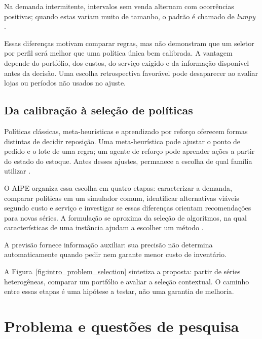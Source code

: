 Na demanda intermitente, intervalos sem venda alternam com ocorrências positivas; quando estas variam muito de tamanho, o padrão é chamado de \textit{lumpy} \citep{Croston1972ForecastingIntermittentDemand,Syntetos2005Categorization,Boylan2008Intermittent}.

Essas diferenças motivam comparar regras, mas não demonstram que um seletor por perfil será melhor que uma política única bem calibrada. A vantagem depende do portfólio, dos custos, do serviço exigido e da informação disponível antes da decisão. Uma escolha retrospectiva favorável pode desaparecer ao avaliar lojas ou períodos não usados no ajuste.

\subsection{Da calibração à seleção de políticas}

Políticas clássicas, meta-heurísticas e aprendizado por reforço oferecem formas distintas de decidir reposição. Uma meta-heurística pode ajustar o ponto de pedido e o lote de uma regra; um agente de reforço pode aprender ações a partir do estado do estoque. Antes desses ajustes, permanece a escolha de qual família utilizar \citep{Syntetos2009InventoryForecastingReview,Boute2022DRLInventoryRoadmap}.

O AIPE organiza essa escolha em quatro etapas: caracterizar a demanda, comparar políticas em um simulador comum, identificar alternativas viáveis segundo custo e serviço e investigar se essas diferenças orientam recomendações para novas séries. A formulação se aproxima da seleção de algoritmos, na qual características de uma instância ajudam a escolher um método \citep{Rice1976AlgorithmSelection,Kotthoff2014AlgorithmSelection}.

A previsão fornece informação auxiliar: sua precisão não determina automaticamente quando pedir nem garante menor custo de inventário.

A Figura~\ref{fig:intro_problem_selection} sintetiza a proposta: partir de séries heterogêneas, comparar um portfólio e avaliar a seleção contextual. O caminho entre essas etapas é uma hipótese a testar, não uma garantia de melhoria.



\section{Problema e questões de pesquisa}


